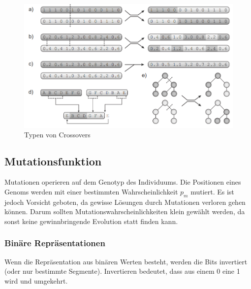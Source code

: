       \begin{figure}[H]
        \includegraphics[scale=0.7, center]{graphics/crossover_types}
        \caption{Typen von Crossovers\cite[S.27]{book:bioInspired}\label{fig:crossTypes}}
      \end{figure}

    \subsection{Mutationsfunktion}

      Mutationen operieren auf dem Genotyp des Individuums.
      Die Positionen eines Genoms werden mit einer bestimmten Wahrscheinlichkeit \(p_{m}\) mutiert.
      Es ist jedoch Vorsicht geboten, da gewisse Lösungen durch Mutationen verloren gehen können.
      Darum sollten Mutationswahrscheinlichkeiten klein gewählt werden, da sonst keine gewinnbringende Evolution statt finden kann.

      \subsubsection{Binäre Repräsentationen}

        Wenn die Repräsentation aus binären Werten besteht, werden die Bits invertiert (oder nur bestimmte Segmente).
        Invertieren bedeutet, dass aus einem 0 eine 1 wird und umgekehrt.

